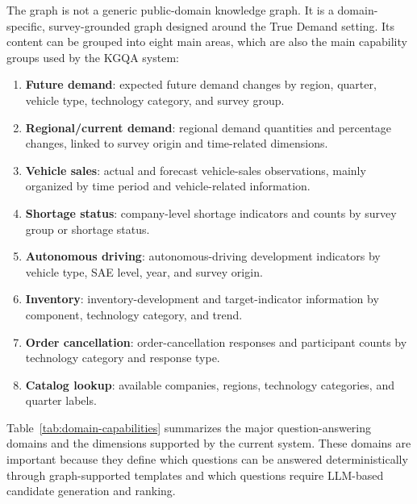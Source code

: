 \documentclass[
  12pt,
  english,
  oneside]{report}
\begin{document}
The graph is not a generic public-domain knowledge graph. It is a domain-specific, survey-grounded graph designed around the True Demand setting. Its content can be grouped into eight main areas, which are also the main capability groups used by the KGQA system:

\begin{enumerate}
    \item \textbf{Future demand}: expected future demand changes by region, quarter, vehicle type, technology category, and survey group.
    \item \textbf{Regional/current demand}: regional demand quantities and percentage changes, linked to survey origin and time-related dimensions.
    \item \textbf{Vehicle sales}: actual and forecast vehicle-sales observations, mainly organized by time period and vehicle-related information.
    \item \textbf{Shortage status}: company-level shortage indicators and counts by survey group or shortage status.
    \item \textbf{Autonomous driving}: autonomous-driving development indicators by vehicle type, SAE level, year, and survey origin.
    \item \textbf{Inventory}: inventory-development and target-indicator information by component, technology category, and trend.
    \item \textbf{Order cancellation}: order-cancellation responses and participant counts by technology category and response type.
    \item \textbf{Catalog lookup}: available companies, regions, technology categories, and quarter labels.
\end{enumerate}

Table~\ref{tab:domain-capabilities} summarizes the major question-answering domains and the dimensions supported by the current system. These domains are important because they define which questions can be answered deterministically through graph-supported templates and which questions require LLM-based candidate generation and ranking.
\end{document}
